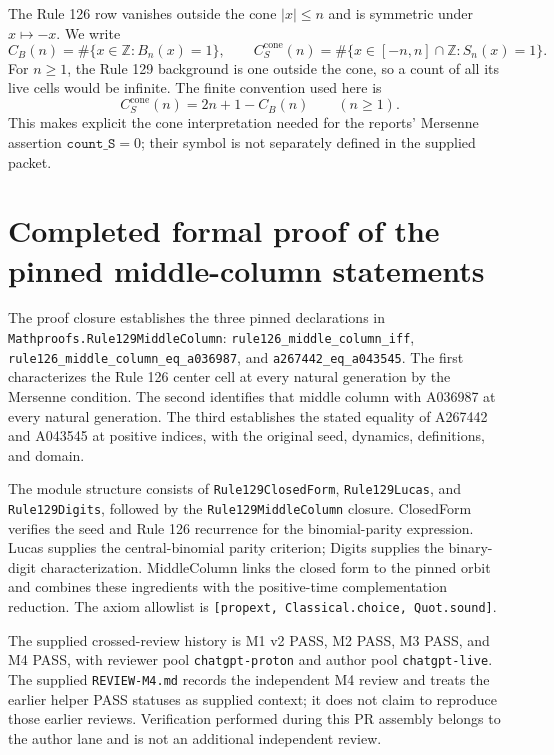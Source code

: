 \documentclass[11pt]{article}
\newcommand{\Z}{\mathbb{Z}}
\begin{document}
The Rule 126 row vanishes outside the cone $|x|\leq n$ and is symmetric
under $x\mapsto-x$. We write
\[
 C_B(n)=\#\{x\in\Z:B_n(x)=1\},\qquad
 C_S^{\mathrm{cone}}(n)=\#\{x\in[-n,n]\cap\Z:S_n(x)=1\}.
\]
For $n\geq1$, the Rule 129 background is one outside the cone, so a count
of all its live cells would be infinite. The finite convention used here is
\begin{equation}
 C_S^{\mathrm{cone}}(n)=2n+1-C_B(n)\qquad(n\geq1).
 \label{eq:conecount}
\end{equation}
This makes explicit the cone interpretation needed for the reports'
Mersenne assertion $\texttt{count\_S}=0$; their symbol is not separately
defined in the supplied packet.

\section{Completed formal proof of the pinned middle-column statements}
\label{sec:formal-proof}

The proof closure establishes the three pinned declarations in
\texttt{Mathproofs.Rule129MiddleColumn}:
\texttt{rule126\_middle\_column\_iff},
\texttt{rule126\_middle\_column\_eq\_a036987}, and
\texttt{a267442\_eq\_a043545}.
The first characterizes the Rule 126 center cell at every natural
generation by the Mersenne condition. The second identifies that
middle column with A036987 at every natural generation. The third
establishes the stated equality of A267442 and A043545 at positive
indices, with the original seed, dynamics, definitions, and domain.

The module structure consists of \texttt{Rule129ClosedForm},
\texttt{Rule129Lucas}, and \texttt{Rule129Digits}, followed by the
\texttt{Rule129MiddleColumn} closure. ClosedForm verifies the seed and
Rule 126 recurrence for the binomial-parity expression. Lucas supplies
the central-binomial parity criterion; Digits supplies the binary-digit
characterization. MiddleColumn links the closed form to the pinned
orbit and combines these ingredients with the positive-time
complementation reduction. The axiom allowlist is
\texttt{[propext, Classical.choice, Quot.sound]}.

The supplied crossed-review history is M1 v2 PASS, M2 PASS, M3 PASS,
and M4 PASS, with reviewer pool \texttt{chatgpt-proton} and author
pool \texttt{chatgpt-live}. The supplied \texttt{REVIEW-M4.md} records
the independent M4 review and treats the earlier helper PASS
statuses as supplied context; it does not claim to reproduce those
earlier reviews. Verification performed during this PR assembly
belongs to the author lane and is not an additional independent
review.
\end{document}
